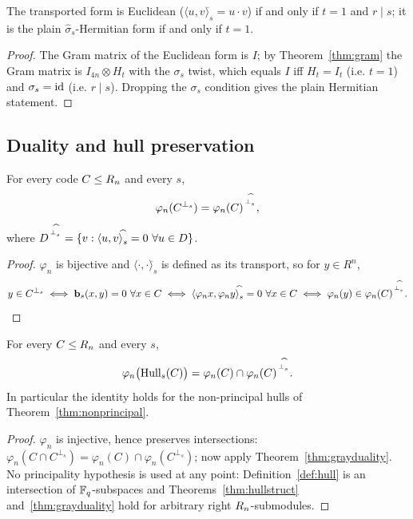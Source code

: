 \begin{corollary}\label{cor:noteuclid}
The transported form is Euclidean ($\langle u,v\rangle^{\widehat{}}_s=u\cdot v$)
if and only if $t=1$ and $r\mid s$; it is the plain
$\widehat\sigma_s$-Hermitian form if and only if $t=1$.
\end{corollary}

\begin{proof}
The Gram matrix of the Euclidean form is $I$; by
Theorem~\ref{thm:gram} the Gram matrix is $I_{4n}\otimes H_t$ with the
$\sigma_s$ twist, which equals $I$ iff $H_t=I_t$ (i.e. $t=1$) and
$\sigma_s=\mathrm{id}$ (i.e. $r\mid s$). Dropping the $\sigma_s$ condition gives the
plain Hermitian statement.
\end{proof}

\subsection{Duality and hull preservation}

\begin{theorem}\label{thm:grayduality}
For every code $C\le R_n$ and every $s$,
\[
  \varphi_n(C^{\perp_s})=\varphi_n(C)^{\,{}^{\perp^{\widehat{}}_s}},
\]
where $D^{\,{}^{\perp^{\widehat{}}_s}}=\{v:\langle u,v\rangle^{\widehat{}}_s=0\ \forall u\in D\}$.
\end{theorem}

\begin{proof}
$\varphi_n$ is bijective and $\langle\cdot,\cdot\rangle^{\widehat{}}_s$ is
defined as its transport, so for $y\in R^n$,
\[
  y\in C^{\perp_s}
  \iff \mathbf b_s(x,y)=0\ \forall x\in C
  \iff \langle\varphi_nx,\varphi_ny\rangle^{\widehat{}}_s=0\ \forall x\in C
  \iff \varphi_n(y)\in\varphi_n(C)^{\,{}^{\perp^{\widehat{}}_s}}. \qedhere
\]
\end{proof}

\begin{theorem}
\label{thm:grayhull}
For every $C\le R_n$ and every $s$,
\[
  \varphi_n\bigl(\operatorname{Hull}_s(C)\bigr)
  =\varphi_n(C)\cap\varphi_n(C)^{\,{}^{\perp^{\widehat{}}_s}}.
\]
In particular the identity holds for the non-principal hulls of
Theorem~\ref{thm:nonprincipal}.
\end{theorem}

\begin{proof}
$\varphi_n$ is injective, hence preserves intersections:
$\varphi_n(C\cap C^{\perp_s})=\varphi_n(C)\cap\varphi_n(C^{\perp_s})$; now
apply Theorem~\ref{thm:grayduality}. No principality hypothesis is used at any
point: Definition~\ref{def:hull} is an intersection of $\mathbb F_q$-subspaces and
Theorems~\ref{thm:hullstruct} and~\ref{thm:grayduality} hold for arbitrary right
$R_n$-submodules.
\end{proof}

